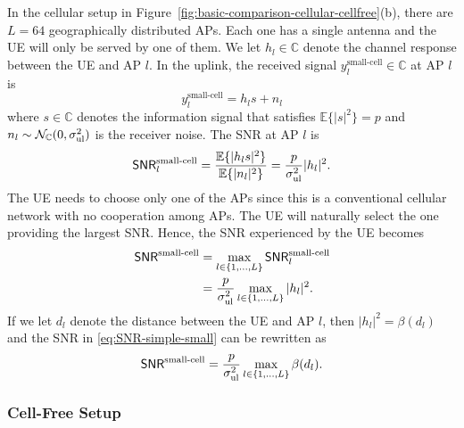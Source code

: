 In the cellular setup in Figure~\ref{fig:basic-comparison-cellular-cellfree}(b), there are $L=64$ geographically distributed \glspl{AP}. Each one has a single antenna and the \gls{UE} will only be served by one of them. We let $h_l\in \mathbb{C}$ denote the channel response between the \gls{UE} and AP $l$. In the uplink, the received signal $y_l^{\textrm{small-cell}} \in \mathbb{C}$ at AP $l$ is 
\begin{equation} \label{eq:basic-uplink-small-cell}
y_l^{\textrm{small-cell}} = h_l s + n_l
\end{equation}
where $s \in \mathbb{C}$ denotes the information signal that satisfies $\mathbb{E}\{ | s|^2 \} = p$ and $n_l \sim \mathcal{N}_{\mathbb{C}} ( 0, \sigma^2_{\mathrm{ul}} )$ is the receiver noise.
The \gls{SNR} at \gls{AP} $l$ is
\begin{equation}
\mathsf{SNR}_l^{\textrm{small-cell}} =   \frac{\mathbb{E}\{ | h_l  s|^2   \} }{ \mathbb{E} \{ | n_l |^2 \}}  = \frac{p}{\sigma^2_{\mathrm{ul}}} |h_l|^2.
\end{equation}
The \gls{UE} needs to choose only one of the \glspl{AP} since this is a conventional cellular network with no cooperation among \glspl{AP}. The \gls{UE} will naturally select the one providing the largest \gls{SNR}. Hence, the \gls{SNR} experienced by the UE becomes
\begin{align}  \notag
\mathsf{SNR}^{\textrm{small-cell}} &= \max_{l \in \{1,\ldots,L\} }
\mathsf{SNR}_l^{\textrm{small-cell}} \\ & =  \frac{p}{\sigma^2_{\mathrm{ul}}} \max_{l \in \{1,\ldots,L\} } |h_l|^2. \label{eq:SNR-simple-small}
\end{align}
If we let $d_l$ denote the distance between the \gls{UE} and \gls{AP} $l$, then $|h_l |^2 = \beta(d_l)$ and the \gls{SNR} in \eqref{eq:SNR-simple-small} can be rewritten as
\begin{equation}
\mathsf{SNR}^{\textrm{small-cell}} =  \frac{p}{\sigma^2_{\mathrm{ul}}} \max_{l \in \{1,\ldots,L\} } \beta(d_l).
\end{equation}


\subsubsection{Cell-Free Setup}


